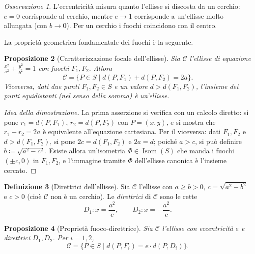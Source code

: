 \documentclass[11pt, a4paper]{book}
\theoremstyle{definition}
\newtheorem{definizione}{Definizione}[section]
\theoremstyle{plain}
\newtheorem{proposizione}[definizione]{Proposizione}
\theoremstyle{remark}
\newtheorem{osservazione}[definizione]{Osservazione}
\DeclareMathOperator{\Isom}{Isom}
\begin{document}
\begin{osservazione}
L'eccentricità misura quanto l'ellisse si discosta da un cerchio: $e=0$ corrisponde al cerchio, mentre $e \to 1$ corrisponde a un'ellisse molto allungata (con $b \to 0$). Per un cerchio i fuochi coincidono con il centro.
\end{osservazione}

La proprietà geometrica fondamentale dei fuochi è la seguente.

\begin{proposizione}[Caratterizzazione focale dell'ellisse]
\label{prop:foc-ellisse}
Sia $\mathcal{C}$ l'ellisse di equazione $\frac{x^2}{a^2}+\frac{y^2}{b^2}=1$ con fuochi $F_1, F_2$. Allora
\[
  \mathcal{C} = \bigl\{ P \in S \;\big|\; d(P,F_1) + d(P,F_2) = 2a \bigr\}.
\]
Viceversa, dati due punti $F_1, F_2 \in S$ e un valore $d > d(F_1,F_2)$, l'insieme dei punti equidistanti (nel senso della somma) è un'ellisse.
\end{proposizione}

\begin{proof}[Idea della dimostrazione]
La prima asserzione si verifica con un calcolo diretto: si pone $r_1 = d(P,F_1)$, $r_2 = d(P,F_2)$ con $P=(x,y)$, e si mostra che $r_1 + r_2 = 2a$ è equivalente all'equazione cartesiana. Per il viceversa: dati $F_1, F_2$ e $d > d(F_1,F_2)$, si pone $2c = d(F_1,F_2)$ e $2a = d$; poiché $a > c$, si può definire $b \coloneqq \sqrt{a^2-c^2}$. Esiste allora un'isometria $\Phi \in \Isom(S)$ che manda i fuochi $(\pm c, 0)$ in $F_1, F_2$, e l'immagine tramite $\Phi$ dell'ellisse canonica è l'insieme cercato.
\end{proof}

\begin{defbox}
\begin{definizione}[Direttrici dell'ellisse]
\label{def:direttrici-ellisse}
Sia $\mathcal{C}$ l'ellisse con $a \geq b > 0$, $c = \sqrt{a^2-b^2}$ e $c > 0$ (cioè $\mathcal{C}$ non è un cerchio). Le \emph{direttrici} di $\mathcal{C}$ sono le rette
\[
  D_1 \colon x = \frac{a^2}{c}, \qquad D_2 \colon x = -\frac{a^2}{c}.
\]
\end{definizione}
\end{defbox}

\begin{proposizione}[Proprietà fuoco-direttrice]
\label{prop:foc-dir-ellisse}
Sia $\mathcal{C}$ l'ellisse con eccentricità $e$ e direttrici $D_1, D_2$. Per $i=1,2$,
\[
  \mathcal{C} = \bigl\{ P \in S \;\big|\; d(P, F_i) = e \cdot d(P, D_i) \bigr\}.
\]
\end{proposizione}
\end{document}
